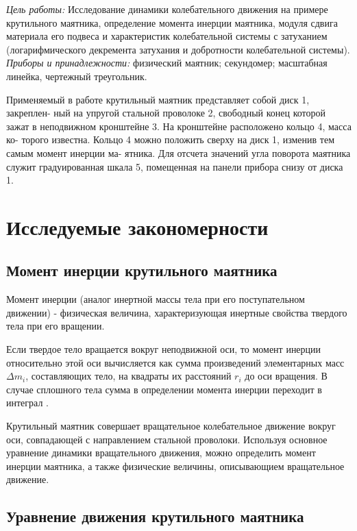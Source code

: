 \documentclass[a4paper,12pt]{report}
\begin{document}
\par
\textit{Цель работы:} Исследование динамики колебательного движения на примере крутильного маятника, определение момента инерции маятника, модуля сдвига материала его подвеса и характеристик колебательной системы с затуханием (логарифмического декремента затухания и добротности колебательной системы).
\textit{Приборы и принадлежности: } физический маятник;
секундомер; масштабная линейка, чертежный треугольник.

Применяемый в работе крутильный маятник представляет собой диск 1, закреплен- ный на упругой стальной проволоке 2, свободный конец которой зажат в неподвижном кронштейне 3. На кронштейне расположено кольцо 4, масса ко- торого известна. Кольцо 4 можно положить сверху на диск 1, изменив тем самым момент инерции ма- ятника. Для отсчета значений угла 
поворота маятника служит градуированная шкала 5, помещенная на панели прибора снизу от диска 1.

\section*{Исследуемые закономерности}

\par

\subsection*{Момент инерции крутильного маятника}
\par
Момент инерции (аналог инертной массы тела при его поступательном движении) - 
физическая величина, характеризующая инертные свойства твердого тела при его вращении. 
\par
Если твердое тело вращается вокруг неподвижной оси, то момент инерции относительно этой оси вычисляется как сумма произведений элементарных масс $\Delta m_i$, составляющих тело, на квадраты их расстояний $r_i$ до оси вращения. В случае сплошного тела сумма в определении момента инерции переходит в интеграл .
\par
Крутильный маятник совершает вращательное колебательное движение вокруг оси, совпадающей с направлением стальной проволоки. Используя основное уравнение динамики вращательного движения, можно определить момент инерции маятника, а также физические величины, описывающием вращательное движение. 

\newpage
\subsection*{Уравнение движения крутильного маятника}
\end{document}
